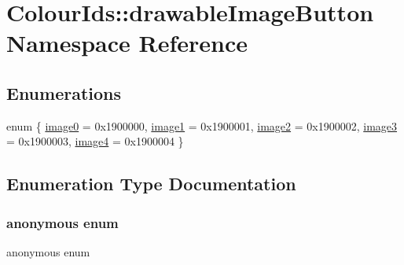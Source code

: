 \hypertarget{namespaceColourIds_1_1drawableImageButton}{}\section{Colour\+Ids\+:\+:drawable\+Image\+Button Namespace Reference}
\label{namespaceColourIds_1_1drawableImageButton}
\subsection*{Enumerations}
\begin{DoxyCompactItemize}
\item 
enum \{ \newline
\mbox{\hyperlink{namespaceColourIds_1_1drawableImageButton_aea56476276e81b1c7fd217b9e3904c77a7c5253fac27a529bc313baff51888fea}{image0}} = 0x1900000, 
\mbox{\hyperlink{namespaceColourIds_1_1drawableImageButton_aea56476276e81b1c7fd217b9e3904c77a90d27dff7d1eb17d19391ff6afa70e22}{image1}} = 0x1900001, 
\mbox{\hyperlink{namespaceColourIds_1_1drawableImageButton_aea56476276e81b1c7fd217b9e3904c77a4421bb935944220d12719367ebe23dea}{image2}} = 0x1900002, 
\mbox{\hyperlink{namespaceColourIds_1_1drawableImageButton_aea56476276e81b1c7fd217b9e3904c77a0e96d4fab556a2938a8029ec94f32b8f}{image3}} = 0x1900003, 
\newline
\mbox{\hyperlink{namespaceColourIds_1_1drawableImageButton_aea56476276e81b1c7fd217b9e3904c77acb4d77f72d7a5ed78d52e4e9a2cffdd2}{image4}} = 0x1900004
 \}
\end{DoxyCompactItemize}


\subsection{Enumeration Type Documentation}
\mbox{\label{namespaceColourIds_1_1drawableImageButton_aea56476276e81b1c7fd217b9e3904c77}} 
\subsubsection{\texorpdfstring{anonymous enum}{anonymous enum}}
{\footnotesize\ttfamily anonymous enum}

